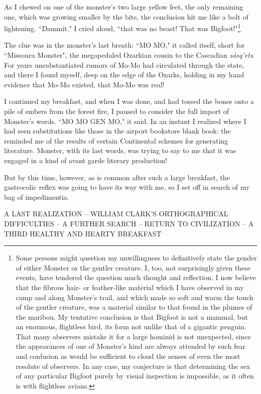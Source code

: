 \par
As I chewed on one of the monster's two large yellow feet, the only remaining one, which was growing smaller by the bite, the conclusion hit me like a bolt of lightening.  ``Dammit," I cried aloud, ``that was no beast!  That was Bigfoot!"\footnote{Some persons might question my unwillingness to definitively state the gender of either Monster or the gentler creature.  I, too, not surprisingly given these events, have tendered the question much thought and reflection.  I now believe that the fibrous hair- or feather-like material which I have observed in my camp and along Monster's trail, and which made so soft and warm the touch of the gentler creature, was a material similar to that found in the plumes of the maribou.  My tentative conclusion is that Bigfoot is not a mammal, but an enormous, flightless bird, its form not unlike that of a gigantic penguin.  That many observers mistake it for a large hominid is not unexpected, since the appearances of one of Monster's kind are always attended by such fear and confusion as would be sufficient to cloud the senses of even the most resolute of observers.  In any case, my conjecture is that determining the sex of any particular Bigfoot purely by visual inspection is impossible, as it often is with flightless avians.}
\par
The clue was in the monster's last breath: ``MO MO," it called itself, short for ``Missoura Monster", the megapedaled Ozarkian cousin to the Cascadian \textit{sásq'ets}.  For years unsubstantiated rumors of Mo-Mo had circulated through the state, and there I found myself, deep on the edge of the Ozarks, holding in my hand evidence that Mo-Mo existed, that Mo-Mo was real!
\par
I continued my breakfast, and when I was done, and had tossed the bones onto a pile of embers from the forest fire, I paused to consider the full import of Monster's words.  ``MO MO GEN MO," it said.  In an instant I realized where I had seen substitutions like those in the airport bookstore blank book: the reminded me of the results of certain Continental schemes for generating literature.  Monster, with its last words, was trying to say to me that it was engaged in a kind of avant garde literary production!
\par
But by this time, however, as is common after such a large breakfast, the gastrocolic reflex was going to have its way with me, so I set off in search of my bag of impedimentia.
\par
\begin{center}
A LAST REALIZATION – WILLIAM CLARK'S ORTHOGRAPHICAL DIFFICULTIES – A FURTHER SEARCH – RETURN TO CIVILIZATION – A THIRD HEALTHY AND HEARTY BREAKFAST
\end{center}
